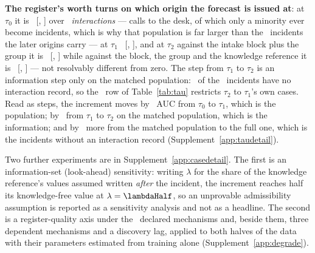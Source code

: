\textbf{The register's worth turns on which origin the forecast is issued
at}: at $\tau_0$ it is \VtauZero\ [\VtauZeroLo, \VtauZeroHi] over
\nTauZero\ \emph{interactions} --- calls to the desk, of which only a
minority ever become incidents, which is why that population is far larger
than the \nTauTwo\ incidents the later origins carry --- at $\tau_1$
\VtauOne\ [\VtauOneLo, \VtauOneHi], and at $\tau_2$ against the intake block
plus the group it is \VTtwoGroup\ [\VTtwoGroupLo, \VTtwoGroupHi] while
against the block, the group and the knowledge reference it is \VTtwoKnow\
[\VTtwoKnowLo, \VTtwoKnowHi] --- not resolvably different from zero. The step
from $\tau_1$ to $\tau_2$ is an information step only on the matched
population: \nTauTwoUnmatched\ of the \nTauTwo\ incidents have no interaction
record, so the \tauMatchedRow\ row of Table~\ref{tab:tau} restricts $\tau_2$
to $\tau_1$'s own cases. Read as steps, the increment moves by
\deltaCohortAtTau\ AUC from $\tau_0$ to $\tau_1$, which is the population; by
\deltaSnapshotAtTau\ from $\tau_1$ to $\tau_2$ on the matched population,
which is the information; and by \deltaPopulationResidual\ more from the
matched population to the full one, which is the incidents without an
interaction record (Supplement~\ref{app:taudetail}).

\label{sec:quality}
Two further experiments are in Supplement~\ref{app:casedetail}. The first is
an information-set (look-ahead) sensitivity: writing $\lambda$ for the share
of the knowledge reference's values assumed written \emph{after} the
incident, the increment reaches half its knowledge-free value at
$\lambda = \lambdaHalf$, so an unprovable admissibility assumption is
reported as a sensitivity analysis and not as a headline. The second is a
register-quality axis under the \nQualityKinds\ declared mechanisms and,
beside them, three dependent mechanisms and a discovery lag, applied to both
halves of the data with their parameters estimated from training alone
(Supplement~\ref{app:degrade}).
